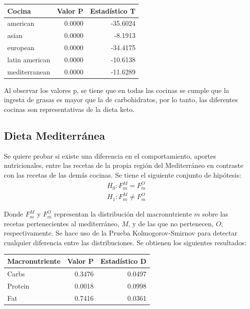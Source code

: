 \documentclass[12pt,a4paper]{article}
\begin{document}
{{            \begin{center}
                \begin{tabular}{l|rr}
                \toprule
                    Cocina & Valor P & Estadístico T \\
                \midrule
                    american       & 0.0000 & -35.6024 \\
                    asian          & 0.0000 &  -8.1913 \\
                    european       & 0.0000 & -34.4175 \\
                    latin american & 0.0000 & -10.6138 \\
                    mediterranean  & 0.0000 & -11.6289 \\
                \bottomrule
                \end{tabular}
            \end{center}

            Al observar los valores p, se tiene que en todas las cocinas se cumple 
            que la ingesta de grasas es mayor que la de carbohidratos, por lo 
            tanto, las diferentes cocinas son representativas de la dieta keto.
        }

        \subsection{Dieta Mediterránea}

        {
            Se quiere probar si existe una diferencia en el comportamiento, aportes 
            nutricionales, entre las recetas de la propia región del Mediterráneo en contraste 
            con las recetas de las demás cocinas. Se tiene el siguiente conjunto de hipótesis:
            \begin{align*}
                H_0 : F^M_m = F^O_m \\
                H_1 : F^M_m \ne F^O_m  
            \end{align*}

            Donde $F^M_m$ y $F^O_m$ representan la distribución del macronutriente $m$ sobre las 
            recetas pertenecientes al mediterráneo, $M$, y de las que no pertenecen, $O$, respectivamente. 
            Se hace uso de la Prueba Kolmogorov-Smirnov para detectar cualquier diferencia entre las distribuciones.
            Se obtienen los siguientes resultados:

            \begin{center}
                \begin{tabular}{l|rr}
                \toprule
                    Macronutriente & Valor P & Estadístico D \\
                \midrule
                    Carbs   & 0.3476 & 0.0497 \\
                    Protein & 0.0018 & 0.0998 \\
                    Fat     & 0.7416 & 0.0361 \\
                \bottomrule
                \end{tabular}
            \end{center}
            
}}
\end{document}
